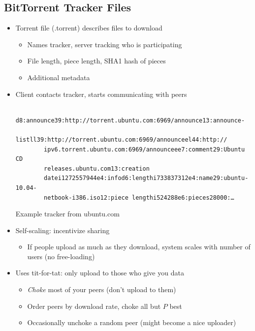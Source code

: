 \subsection{BitTorrent Tracker Files}
\begin{itemize}[nosep]
    \item Torrent file (.torrent) describes files to download
          \begin{itemize}[nosep]
              \item Names tracker, server tracking who is participating
              \item File length, piece length, SHA1 hash of pieces
              \item Additional metadata
          \end{itemize}
    \item Client contacts tracker, starts communicating with peers
          \begin{verbatim}
        d8:announce39:http://torrent.ubuntu.com:6969/announce13:announce-
        listll39:http://torrent.ubuntu.com:6969/announceel44:http://
        ipv6.torrent.ubuntu.com:6969/announceee7:comment29:Ubuntu CD
        releases.ubuntu.com13:creation
        datei1272557944e4:infod6:lengthi733837312e4:name29:ubuntu-10.04-
        netbook-i386.iso12:piece lengthi524288e6:pieces28000:…
    \end{verbatim}
          Example tracker from ubuntu.com
    \item Self-scaling: incentivize sharing
          \begin{itemize}[nosep]
              \item If people upload as much as they download, system scales with number of users (no free-loading)
          \end{itemize}
    \item Uses tit-for-tat: only upload to those who give you data
          \begin{itemize}[nosep]
              \item \emph{Choke} most of your peers (don't upload to them)
              \item Order peers by download rate, choke all but $P$ best
              \item Occasionally unchoke a random peer (might become a nice uploader)
          \end{itemize}
\end{itemize}
